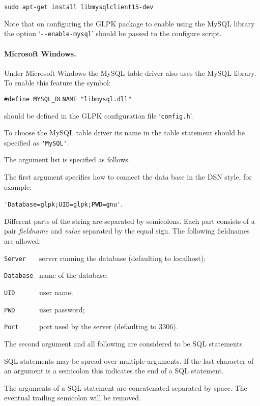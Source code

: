 \documentclass[10pt]{article}
\begin{document}
\begin{verbatim}
sudo apt-get install libmysqlclient15-dev
\end{verbatim}

Note that on configuring the GLPK package to enable using the MySQL
library the option `\verb|--enable-mysql|' should be passed to the
configure script.

\paragraph{Microsoft Windows.}
Under Microsoft Windows the MySQL table driver also uses the MySQL
library. To enable this feature the symbol:

\begin{verbatim}
#define MYSQL_DLNAME "libmysql.dll"
\end{verbatim}

\noindent
should be defined in the GLPK configuration file `\verb|config.h|'.

\bigskip

To choose the MySQL table driver its name in the table statement should
be specified as \verb|'MySQL'|.

The argument list is specified as follows.

The first argument specifies how to connect the data base in the DSN
style, for example:

\verb|'Database=glpk;UID=glpk;PWD=gnu'|.

Different parts of the string are separated by semicolons. Each part
consists of a pair {\it fieldname} and {\it value} separated by the
equal sign. The following fieldnames are allowed:

\verb|Server   | server running the database (defaulting to localhost);

\verb|Database | name of the database;

\verb|UID      | user name;

\verb|PWD      | user password;

\verb|Port     | port used by the server (defaulting to 3306).

The second argument and all following are considered to be SQL
statements

SQL statements may be spread over multiple arguments.  If the last
character of an argument is a semicolon this indicates the end of
a SQL statement.

The arguments of a SQL statement are concatenated separated by space.
The eventual trailing semicolon will be removed.
\end{document}

